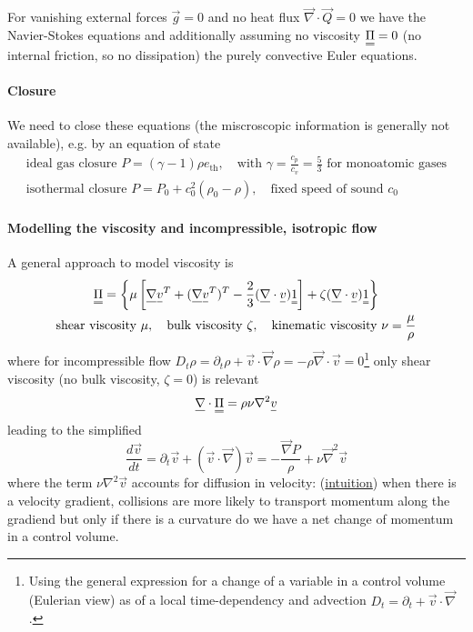 For vanishing external forces $\vec{g} = 0$ and no heat flux $\vec{\nabla} \cdot \vec{Q} = 0$ we
have the \textcolor{blue1}{Navier-Stokes equations} and additionally assuming no viscosity $\mat{\Pi} = 0$ (no internal friction, so no dissipation) the purely
convective \textcolor{blue1}{Euler equations}.
\paragraph*{Closure} We need to close these equations (the miscroscopic information is generally not available), e.g. by an equation of state
\begin{equation}
    \begin{gathered}
        \text{ideal gas closure } P = (\gamma - 1) \rho e_{\text{th}}, \quad \text{with } \gamma = \frac{c_p}{c_v} = \frac{5}{3} \text{ for monoatomic gases} \\
        \text{isothermal closure } P = P_0 + c_0^2 (\rho_0 - \rho), \quad \text{fixed speed of sound } c_0
    \end{gathered}
\end{equation}
\paragraph*{Modelling the viscosity and incompressible, isotropic flow} A general approach to model viscosity is
\begin{equation}
    \begin{gathered}
        \mat{\Pi} = \left\{ \mu \left[ \vec{\nabla} \vec{v}^T + (\vec{\nabla} \vec{v}^T)^T - \frac{2}{3} (\vec{\nabla}\cdot \vec{v}) \mat{1} \right] + \zeta (\vec{\nabla}\cdot \vec{v}) \mat{1} \right\} \\
        \text{shear viscosity } \mu, \quad \text{bulk viscosity } \zeta, \quad \text{kinematic viscosity } \nu = \frac{\mu}{\rho}
    \end{gathered}
\end{equation}
where for incompressible flow $D_t \rho = \partial_t \rho + \vec{v} \cdot \vec{\nabla} \rho = -\rho \vec{\nabla} \cdot \vec{v} = 0$\footnote{Using the 
general expression for a change of a variable in a control volume (Eulerian view) as of a local time-dependency
and advection $D_t = \partial_t + \vec{v}\cdot \vec{\nabla}$.} only shear viscosity (no bulk viscosity, $\zeta = 0$) is relevant
\begin{equation}
    \vec{\nabla} \cdot \mat{\Pi} = \rho \nu \nabla^2 \vec{v}
\end{equation}
leading to the simplified
\begin{equation}
    \frac{d\vec{v}}{dt} = \partial_t \vec{v} + (\vec{v} \cdot \vec{\nabla}) \vec{v} = -\frac{\vec{\nabla}P}{\rho} + \nu \vec{\nabla}^2 \vec{v}
\end{equation}
where the term $\nu \nabla^2 \vec{v}$ accounts for diffusion in velocity: (\underline{intuition}) when there is a velocity gradient,
collisions are more likely to transport momentum along the gradiend but only if there is a curvature
do we have a net change of momentum in a control volume.

